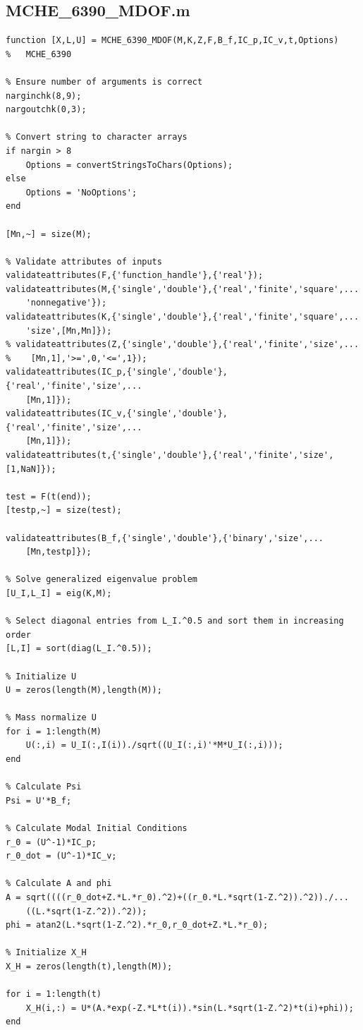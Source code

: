 \documentclass{article}
\begin{document}
\subsection*{MCHE\_6390\_MDOF.m}
\begin{lstlisting}[style=Matlab-editor]
function [X,L,U] = MCHE_6390_MDOF(M,K,Z,F,B_f,IC_p,IC_v,t,Options)
%   MCHE_6390

% Ensure number of arguments is correct
narginchk(8,9);
nargoutchk(0,3);

% Convert string to character arrays
if nargin > 8
    Options = convertStringsToChars(Options);
else
    Options = 'NoOptions';
end

[Mn,~] = size(M);

% Validate attributes of inputs
validateattributes(F,{'function_handle'},{'real'});
validateattributes(M,{'single','double'},{'real','finite','square',...
    'nonnegative'});
validateattributes(K,{'single','double'},{'real','finite','square',...
    'size',[Mn,Mn]});
% validateattributes(Z,{'single','double'},{'real','finite','size',...
%    [Mn,1],'>=',0,'<=',1});
validateattributes(IC_p,{'single','double'},{'real','finite','size',...
    [Mn,1]});
validateattributes(IC_v,{'single','double'},{'real','finite','size',...
    [Mn,1]});
validateattributes(t,{'single','double'},{'real','finite','size',[1,NaN]});

test = F(t(end));
[testp,~] = size(test);

validateattributes(B_f,{'single','double'},{'binary','size',...
    [Mn,testp]});

% Solve generalized eigenvalue problem
[U_I,L_I] = eig(K,M);

% Select diagonal entries from L_I.^0.5 and sort them in increasing order
[L,I] = sort(diag(L_I.^0.5));

% Initialize U
U = zeros(length(M),length(M));

% Mass normalize U
for i = 1:length(M)
    U(:,i) = U_I(:,I(i))./sqrt((U_I(:,i)'*M*U_I(:,i)));
end

% Calculate Psi
Psi = U'*B_f;

% Calculate Modal Initial Conditions
r_0 = (U^-1)*IC_p;
r_0_dot = (U^-1)*IC_v;

% Calculate A and phi
A = sqrt((((r_0_dot+Z.*L.*r_0).^2)+((r_0.*L.*sqrt(1-Z.^2)).^2))./...
    ((L.*sqrt(1-Z.^2)).^2));
phi = atan2(L.*sqrt(1-Z.^2).*r_0,r_0_dot+Z.*L.*r_0);

% Initialize X_H
X_H = zeros(length(t),length(M));

for i = 1:length(t)
    X_H(i,:) = U*(A.*exp(-Z.*L*t(i)).*sin(L.*sqrt(1-Z.^2)*t(i)+phi));
end


\end{lstlisting}
\end{document}
